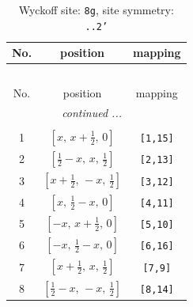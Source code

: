 \documentclass[fleqn,8pt]{jsarticle}
\begin{document}
\renewcommand{\arraystretch}{1.2}
\begin{longtable}{ccc}
\caption{Wyckoff site: {\tt 8g}, site symmetry: {\tt ..2'}}
 \\
 \hline \hline
No. & position & mapping \\ \hline \endfirsthead

\multicolumn{2}{l}{\tablename\ \thetable{}} \\
 \hline \hline
No. & position & mapping \\ \hline \endhead

 \hline \hline
\multicolumn{2}{r}{\footnotesize\it continued ...} \\ \endfoot

 \hline \hline
\multicolumn{2}{r}{} \\ \endlastfoot

1 & $\left[ x,\, x + \frac{1}{2},\, 0 \right]$ & {\tt [1,15]} \\ \hline
2 & $\left[ \frac{1}{2} - x,\, x,\, \frac{1}{2} \right]$ & {\tt [2,13]} \\ \hline
3 & $\left[ x + \frac{1}{2},\, - x,\, \frac{1}{2} \right]$ & {\tt [3,12]} \\ \hline
4 & $\left[ x,\, \frac{1}{2} - x,\, 0 \right]$ & {\tt [4,11]} \\ \hline
5 & $\left[ - x,\, x + \frac{1}{2},\, 0 \right]$ & {\tt [5,10]} \\ \hline
6 & $\left[ - x,\, \frac{1}{2} - x,\, 0 \right]$ & {\tt [6,16]} \\ \hline
7 & $\left[ x + \frac{1}{2},\, x,\, \frac{1}{2} \right]$ & {\tt [7,9]} \\ \hline
8 & $\left[ \frac{1}{2} - x,\, - x,\, \frac{1}{2} \right]$ & {\tt [8,14]} \\
\end{longtable}
\renewcommand{\arraystretch}{1.2}
\end{document}
